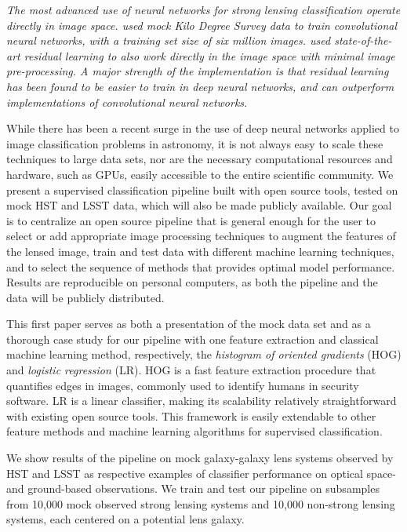 \documentclass{emulateapj}
\newcommand{\wording}[1]{{\it\color{purple} #1}}
\begin{document}
\wording{The most advanced use of neural networks for strong lensing
  classification operate directly in image space.
  \citep{petrillo_etal17} used mock Kilo Degree Survey data to train
  convolutional neural networks, with a training set size of six
  million images. \citet{lanusse_etal17} used state-of-the-art
  residual learning to also work directly in the image space with
  minimal image pre-processing.  A major strength of the
  \citet{lanusse_etal17} implementation is that residual learning has
  been found to be easier to train in deep neural networks, and can
  outperform implementations of convolutional neural networks.}

While there has been a recent surge in the use of deep neural
networks applied to image classification problems in astronomy,
it is not always easy to scale these techniques to large data
sets, nor are the necessary computational resources and hardware,
such as GPUs, easily accessible to the
entire scientific community.  We present a supervised classification
pipeline built with open source tools, tested on mock HST and LSST
data, which will also be made publicly available.  Our goal is to
centralize an open source pipeline that is general enough for the
user to select or add appropriate image processing techniques to
augment the features of the lensed image, train and test data with
different machine learning techniques, and to select the sequence of
methods that provides optimal model performance.  Results are
reproducible on personal computers, as both the pipeline and the
data will be publicly distributed.

This first paper serves as both a presentation of the mock data set
and as a thorough case study for our pipeline with one feature
extraction and classical machine learning method, respectively, the
{\em histogram of oriented gradients} (HOG) and {\em logistic
  regression} (LR).  HOG is a fast feature extraction procedure that
quantifies edges in images, commonly used to identify humans in
security software.  LR is a linear classifier, making its scalability
relatively straightforward with existing open source tools.  This
framework is easily extendable to other feature methods and machine
learning algorithms for supervised classification.

We show results of the pipeline on mock galaxy-galaxy lens systems
observed by HST and LSST as respective examples of classifier
performance on optical space- and ground-based observations.  We train
and test our pipeline on subsamples from 10,000 mock observed strong
lensing systems and 10,000 non-strong lensing systems, each centered
on a potential lens galaxy.
\end{document}
